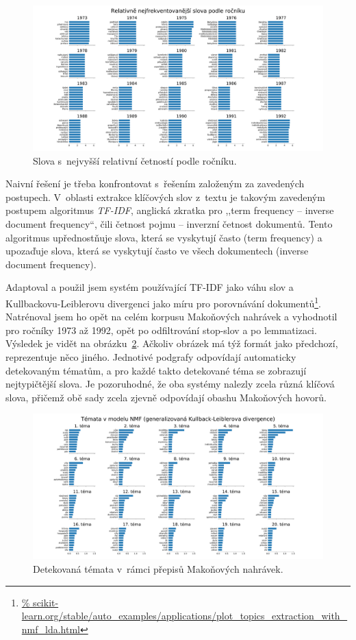 \begin{figure}[htpb]
\includegraphics[scale=0.32, angle=90]{rc/topics-by-year-relfreq.pdf}
\caption{%
  Slova s~nejvyšší relativní četností podle ročníku.
}
\label{fig:topic-by-year-relfreq}
\end{figure}

Naivní řešení je třeba konfrontovat s~řešením založeným za zavedených postupech.
V~oblasti extrakce klíčových slov z~textu je takovým zavedeným postupem
algoritmus \textit{TF-IDF}\cite{Beel2016-11Resea-32348}, anglická zkratka pro
,,term frequency -- inverse document frequency``, čili četnost pojmu -- inverzní
četnost dokumentů. Tento algoritmus upřednostňuje slova, která se vyskytují
často (term frequency) a upozaďuje slova, která se vyskytují často ve všech
dokumentech (inverse document frequency).

Adaptoval a použil jsem systém používající TF-IDF jako váhu slov a
Kull\-back\-ovu-Leib\-ler\-ovu divergenci
jako míru pro porovnávání dokumentů\footnote{\url{%
scikit-learn.org/stable/auto\_examples/applications/plot\_topics\_extraction\_with\_nmf\_lda.html}}.
Natrénoval jsem ho opět na celém korpusu Makoňových nahrávek a vyhodnotil pro
ročníky 1973 až 1992, opět po odfiltrování stop-slov a po lemmatizaci. Výsledek
je vidět na obrázku~\ref{fig:topic-by-year-kld}. Ačkoliv obrázek má týž formát
jako předchozí, reprezentuje něco jiného. Jednotivé podgrafy odpovídají
automaticky detekovaným tématům, a pro každé takto detekované téma se zobrazují
nejtypičtější slova.
Je pozoruhodné, že oba systémy nalezly zcela různá klíčová slova, přičemž obě
sady zcela zjevně odpovídají obashu Makoňových hovorů.

\begin{figure}[htpb]
\includegraphics[scale=0.32, angle=90]{rc/topics-by-year-kld.pdf}
\caption{Detekovaná témata v~rámci přepisů Makoňových nahrávek.}
\label{fig:topic-by-year-kld}
\end{figure}


